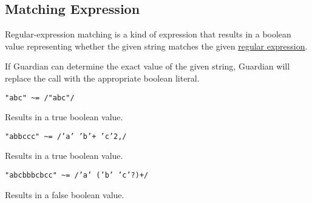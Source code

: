 
\subsection{Matching Expression}
{
	Regular-expression matching is a kind of expression that results in
	a boolean value representing whether the given string matches
	the given \hyperref[sec:regex]{regular expression}.
	
	If Guardian can determine the exact value of the given string,
	Guardian will replace the call with the appropriate boolean literal.
	
	\begin{itemize}
	{
		\item \texttt{"abc" \~{}= /"abc"/}
		
			Results in a true boolean value.
		
		\item \texttt{"abbccc" \~{}= /'a' 'b'+ 'c'{2,}/}
		
			Results in a true boolean value.
		
		\item \texttt{"abcbbbcbcc" \~{}= /'a' ('b' 'c'?)+/}
		
			Results in a false boolean value.
	}
	\end{itemize}
}
